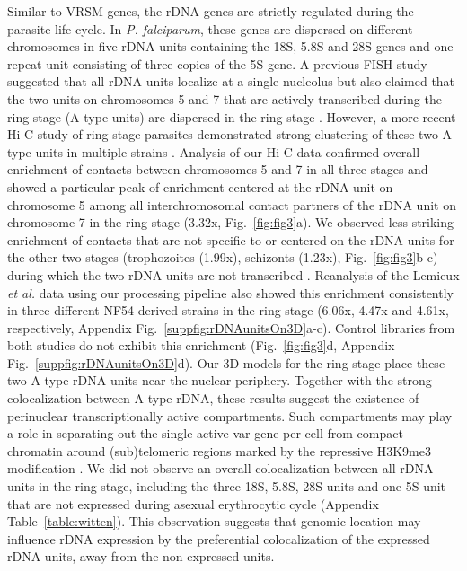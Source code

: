 Similar to VRSM genes, the rDNA genes are strictly regulated during the
parasite life cycle. In {\em P. falciparum}, these genes are dispersed on
different chromosomes in five rDNA units containing the 18S, 5.8S and 28S
genes and one repeat unit consisting of three copies of the 5S gene. A
previous FISH study suggested that all rDNA units localize at a single
nucleolus but also claimed that the two units on chromosomes 5 and 7 that are
actively transcribed during the ring stage (A-type units) are dispersed in the
ring stage \citep{mancio-silva:clustering}. However, a more recent Hi-C study
of ring stage parasites demonstrated strong clustering of these two A-type
units in multiple strains \citep{lemieux:genome-wide}. Analysis of our Hi-C
data confirmed overall enrichment of contacts between chromosomes 5 and 7 in
all three stages and showed a particular peak of enrichment centered at the
rDNA unit on chromosome 5 among all interchromosomal contact partners of the
rDNA unit on chromosome 7 in the ring stage (3.32x, Fig.~\ref{fig:fig3}a). We
observed less striking enrichment of contacts that are not specific to or
centered on the rDNA units for the other two stages (trophozoites (1.99x),
schizonts (1.23x), Fig.~\ref{fig:fig3}b-c) during which the two rDNA units are
not transcribed \citep{mancio-silva:clustering}. Reanalysis of the Lemieux
{\em et al.} data using our processing pipeline also showed this enrichment
consistently in three different NF54-derived strains in the ring stage (6.06x,
4.47x and 4.61x, respectively, Appendix
Fig.~\ref{suppfig:rDNAunitsOn3D}a-c). Control libraries from both studies do
not exhibit this enrichment (Fig.~\ref{fig:fig3}d, Appendix
Fig.~\ref{suppfig:rDNAunitsOn3D}d). Our 3D models for the ring stage place
these two A-type rDNA units near the nuclear periphery. Together with the
strong colocalization between A-type rDNA, these results suggest the existence
of perinuclear transcriptionally active compartments. Such compartments may
play a role in separating out the single active var gene per cell from compact
chromatin around (sub)telomeric regions marked by the repressive H3K9me3
modification \citep{lopez-rubio:genome-wide}. We did not observe an overall
colocalization between all rDNA units in the ring stage, including the three
18S, 5.8S, 28S units and one 5S unit that are not expressed during asexual
erythrocytic cycle (Appendix Table~\ref{table:witten}).  This
observation suggests that genomic location may influence rDNA expression by
the preferential colocalization of the expressed rDNA units, away from the
non-expressed units.

